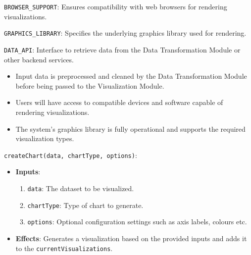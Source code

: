 \documentclass[12pt, titlepage]{article}
\begin{document}
\begin{description}
\begin{description}
  \item[Environment Variables:] 
  \item \texttt{BROWSER\_SUPPORT}: Ensures compatibility with web browsers for rendering visualizations.
  \item \texttt{GRAPHICS\_LIBRARY}: Specifies the underlying graphics library used for rendering.
  \item \texttt{DATA\_API}: Interface to retrieve data from the Data Transformation Module or other 
  backend services.
  \item 

  \item[Assumptions:]
  \item
  \begin{itemize}
    \item Input data is preprocessed and cleaned by the Data Transformation Module before being passed to the
    Visualization Module.
  \end{itemize}
  \item 
  \begin{itemize}
    \item Users will have access to compatible devices and software capable of rendering visualizations.
  \end{itemize}
  \item 
  \begin{itemize}
    \item The system's graphics library is fully operational and supports the required visualization types.
  \end{itemize}
  \item 

  \item[Access Routine Semantics:] 
  \item \texttt{createChart(data, chartType, options)}:
  \begin{itemize}
    \item \textbf{Inputs}:
    \begin{enumerate}
      \item \texttt{data}: The dataset to be visualized.
      \item \texttt{chartType}: Type of chart to generate.
      \item \texttt{options}: Optional configuration settings such as axis labels, colours etc.
    \end{enumerate}

    \item \textbf{Effects}: Generates a visualization based on the provided inputs and adds it to 
    the \texttt{currentVisualizations}.


\end{itemize}
\end{description}
\end{description}
\end{document}

